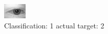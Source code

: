 \begin{figure}[h!]
\begin{center}
\includegraphics[width=0.60\columnwidth]{figures/ID422_class_1_target_2.png}
\end{center}
\caption{ Classification: 1 actual target: 2}
\label{fig:ID422_class_1_target_2}
\end{figure}
